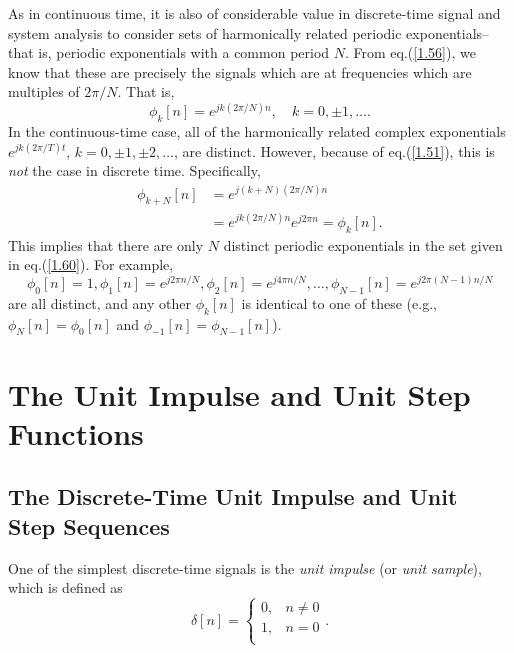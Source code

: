 \documentclass[a4paper,10pt,twoside]{book}
\begin{document}
As in continuous time, it is also of considerable value in discrete-time signal and system analysis to consider sets of harmonically related periodic exponentials--that is, periodic exponentials with a common period $N$. From eq.\;(\ref{1.56}), we know that these are precisely the signals which are at frequencies which are multiples of $2\pi/N$. That is,
\begin{equation}
    \phi_{k}[n] = e^{j k(2\pi/N)n},\quad k = 0,\pm1,\ldots.
    \label{1.60}
\end{equation}
In the continuous-time case, all of the harmonically related complex exponentials $e^{jk(2\pi/T)t}$, $k=0,\pm 1,\pm 2,\ldots$, are distinct. However, because of eq.\;(\ref{1.51}), this is \textit{not} the case in discrete time. Specifically,
\begin{equation}
    \begin{aligned}\phi_{k+N}[n]&= e^{j(k+N)(2\pi/N)n}\\&= e^{jk(2\pi/N)n}e^{j2\pi n} = \phi_{k}[n].\end{aligned}
    \label{1.61}
\end{equation}
This implies that there are only $N$ distinct periodic exponentials in the set given in eq.\;(\ref{1.60}). For example,
\begin{equation}
    \phi_{0}[n]=1,\phi_{1}[n]=e^{j2\pi n/N},\phi_{2}[n]=e^{j4\pi n/N},\ldots,\phi_{N-1}[n]=e^{j2\pi(N-1)n/N}
    \label{1.62}
\end{equation}
are all distinct, and any other $\phi_k[n]$ is identical to one of these (e.g., $\phi_N[n]=\phi_0[n]$ and $\phi_{-1}[n]=\phi_{N-1}[n]$).

\section{The Unit Impulse and Unit Step Functions}
\subsection{The Discrete-Time Unit Impulse and Unit Step Sequences}

One of the simplest discrete-time signals is the \textit{unit impulse} (or \textit{unit sample}), which is defined as
\begin{equation}
    \delta[n]=\left\{\begin{array}{ll}{0,}&{n\neq0}\\{1,}&{n=0}\\\end{array}\right..
    \label{1.63}
\end{equation}
\end{document}
